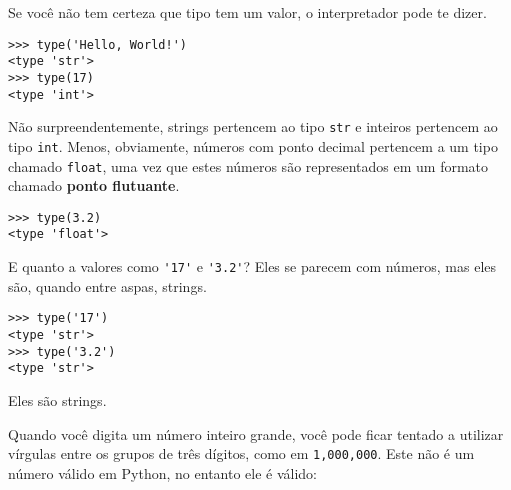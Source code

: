 Se você não tem certeza que tipo tem um valor, o interpretador pode te dizer.

\beforeverb
\begin{verbatim}
>>> type('Hello, World!')
<type 'str'>
>>> type(17)
<type 'int'>
\end{verbatim}
\afterverb
% 

Não surpreendentemente, strings pertencem ao tipo {\tt str} e 
inteiros pertencem ao tipo {\tt int}. Menos, obviamente, números 
com ponto decimal pertencem a um tipo chamado {\tt float},
uma vez que estes números são representados em um formato 
chamado {\bf ponto flutuante}.


\beforeverb
\begin{verbatim}
>>> type(3.2)
<type 'float'>
\end{verbatim}
\afterverb

E quanto a valores como \verb"'17'" e \verb"'3.2'"?
Eles se parecem com números, mas eles são, quando entre aspas, 
strings.


\beforeverb
\begin{verbatim}
>>> type('17')
<type 'str'>
>>> type('3.2')
<type 'str'>
\end{verbatim}
\afterverb
%

Eles são strings.

Quando você digita um número inteiro grande, você pode ficar tentado a utilizar vírgulas 
entre os grupos de três dígitos, como em {\tt 1,000,000}. Este não é um 
número válido em Python, no entanto ele é válido:

